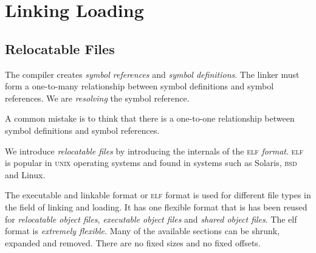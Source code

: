 
\chapter{Linking Loading}


\section{Relocatable Files}


The compiler creates \textit{symbol references} and \textit{symbol definitions}.
The linker must form a one-to-many relationship between symbol definitions 
and symbol references. We are \textit{resolving} the symbol reference.


A common mistake is to think that there is a one-to-one relationship between 
symbol definitions and symbol references. 

\frmrule

We introduce \textit{relocatable files} 
by introducing the internals of the \textsc{elf} \textit{format}.
\textsc{elf} is popular in \textsc{unix} operating systems and 
found in systems such as Solaris, \textsc{bsd} and Linux.


The executable and linkable format or \textsc{elf} format is used for 
different file types in the field of linking and loading. 
It has one flexible format that is has been reused for \textit{relocatable 
object files}, \textit{executable object files} and \textit{shared object files}. 
The elf format is \textit{extremely flexible}. Many of the available sections can be shrunk, 
expanded and removed. There are no fixed sizes and no fixed offsets. 




\begin{figure}[h]
\end{figure}

